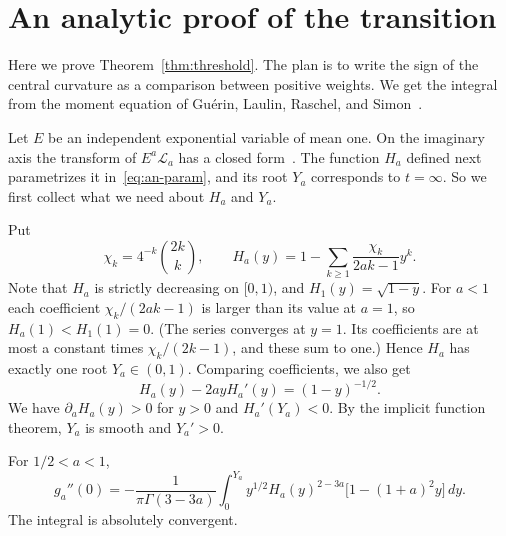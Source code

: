 \section{An analytic proof of the transition}\label{app:analytic-threshold}

Here we prove Theorem~\ref{thm:threshold}. The plan is to write the
sign of the central curvature as a comparison between positive
weights. We get the integral from the moment equation of Gu\'erin,
Laulin, Raschel, and Simon~\cite[(15)]{glrs2025}.

Let $E$ be an independent exponential variable of mean one. On the
imaginary axis the transform of $E^a\mathcal L_a$ has a closed
form~\cite[Proposition~3.2]{glrs2025}. The function $H_a$ defined next
parametrizes it in~\eqref{eq:an-param}, and its root $Y_a$ corresponds
to $t=\infty$. So we first collect what we need about $H_a$ and $Y_a$.

Put
\begin{equation}\label{eq:an-H}
 \chi_k=4^{-k}\binom{2k}{k},\qquad
 H_a(y)=1-\sum_{k\ge1}\frac{\chi_k}{2ak-1}y^k.
\end{equation}
Note that $H_a$ is strictly decreasing on $[0,1)$, and $H_1(y)=\sqrt{1-y}$.
For $a<1$ each coefficient $\chi_k/(2ak-1)$ is larger than its value at
$a=1$, so $H_a(1)<H_1(1)=0$.
(The series converges at $y=1$. Its coefficients are at most a
constant times $\chi_k/(2k-1)$, and these sum to one.) Hence $H_a$
has exactly one root $Y_a\in(0,1)$. Comparing coefficients, we also
get
\begin{equation}\label{eq:an-H-ode}
 H_a(y)-2ayH_a'(y)=(1-y)^{-1/2}.
\end{equation}
We have $\partial_aH_a(y)>0$ for $y>0$ and $H_a'(Y_a)<0$. By the
implicit function theorem, $Y_a$ is smooth and $Y_a'>0$.

\begin{lemma}\label{lem:curvature-weight}
For $1/2<a<1$,
\begin{equation}\label{eq:an-curvature}
 g_a''(0)=-\frac{1}{\pi\Gamma(3-3a)}
 \int_0^{Y_a}y^{1/2}H_a(y)^{2-3a}
             \bigl[1-(1+a)^2y\bigr]\,d y.
\end{equation}
The integral is absolutely convergent.
\end{lemma}

